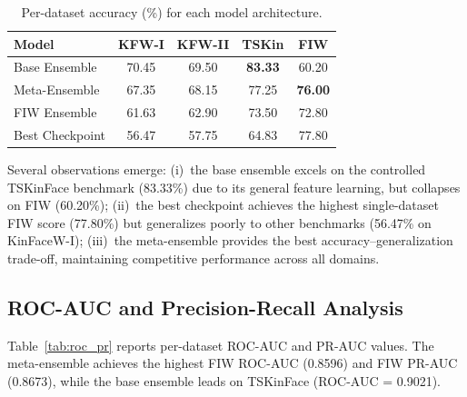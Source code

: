 \documentclass[journal,12pt]{IEEEtran}
\begin{document}
\begin{table}[t]
    \centering
    \caption{Per-dataset accuracy (\%) for each model architecture.}
    \label{tab:cross_dataset}
    \begin{tabular}{lcccc}
        \toprule
        \textbf{Model} & \textbf{KFW-I} & \textbf{KFW-II} & \textbf{TSKin} & \textbf{FIW} \\
        \midrule
        Base Ensemble   & 70.45 & 69.50 & \textbf{83.33} & 60.20 \\
        Meta-Ensemble   & 67.35 & 68.15 & 77.25 & \textbf{76.00} \\
        FIW Ensemble    & 61.63 & 62.90 & 73.50 & 72.80 \\
        Best Checkpoint & 56.47 & 57.75 & 64.83 & 77.80 \\
        \bottomrule
    \end{tabular}
\end{table}

Several observations emerge: (i)~the base ensemble excels on the controlled
TSKinFace benchmark (83.33\%) due to its general feature learning, but
collapses on FIW (60.20\%); (ii)~the best checkpoint achieves the highest
single-dataset FIW score (77.80\%) but generalizes poorly to other
benchmarks (56.47\% on KinFaceW-I); (iii)~the meta-ensemble provides the
best accuracy--generalization trade-off, maintaining competitive
performance across all domains.

\subsection{ROC-AUC and Precision-Recall Analysis}
\label{sec:roc_pr}

Table~\ref{tab:roc_pr} reports per-dataset ROC-AUC and PR-AUC values.
The meta-ensemble achieves the highest FIW ROC-AUC (0.8596) and FIW
PR-AUC (0.8673), while the base ensemble leads on TSKinFace
(ROC-AUC = 0.9021).

\begin{table}[t]
    \centering
    \caption{ROC-AUC / PR-AUC per dataset for each model architecture.}
    \label{tab:roc_pr}
\end{table}
\end{document}
